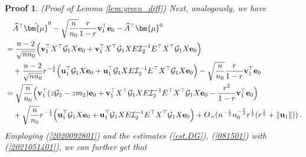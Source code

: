 \documentclass[12pt]{article}
\numberwithin{equation}{section}
\newtheorem{myPro}{Proof}
\theoremstyle{remark}
\newcommand{\1}{{\rm 1}\kern-0.24em{\rm I}}
\begin{document}
\begin{appendices}
\begin{myPro}{(Proof of Lemma \ref{lem:green_diff})}
Next, analogously, we have 
\begin{align*}
&\quad \widehat{A} ^{\top} \hat{\bm{\mu}}^0- \sqrt{\frac{n}{n_0}} \frac{r}{1-r} {\bf v}_1^{\top} {\bf e}_0 - \widehat{A} ^{\top} {\bm{\mu}}^0\notag\\
&= \frac{n-2}{\sqrt{nn_0}} \Big( {\bf v}_1^{\top} {X}^{\top} \mathcal{G}_1  {X}{\bf e}_0+ {\bf v}_1^{\top} {X}^{\top} \mathcal{G}_1{X}{E} \mathcal{I}_2^{-1}{E}^{\top} {X}^{\top} \mathcal{G}_1 {X}{\bf e}_0\Big)\notag\\
&\quad +  \frac{n-2}{\sqrt{nn_0}} r^{-\frac 14}\Big( {\bf u}_1^{\top}  \mathcal{G}_1  {X}{\bf e}_0+ {\bf u}_1^{\top} \mathcal{G}_1{X}{E} \mathcal{I}_2^{-1}{E}^{\top} {X}^{\top} \mathcal{G}_1 {X}{\bf e}_0\Big) - \sqrt{\frac{n}{n_0}} \frac{r}{1-r} {\bf v}_1^{\top} {\bf e}_0\notag\\
&= \sqrt{\frac{n}{n_0}} \Big({\bf v}_1^{\top}(z\mathcal{G}_2-zm_2){\bf e}_0 + {\bf v}_1^{\top} {X}^{\top} \mathcal{G}_1{X}{E} \mathcal{I}_2^{-1}{E}^{\top} {X}^{\top} \mathcal{G}_1 {X}{\bf e}_0 - \frac{r^2}{1-r} {\bf v}_1^{\top} {\bf e}_0\Big)\notag\\
&\quad + \sqrt{\frac{n}{n_0}}r^{-\frac 14}\Big( {\bf u}_1^{\top}  \mathcal{G}_1  {X}{\bf e}_0+ {\bf u}_1^{\top} \mathcal{G}_1{X}{E}\mathcal{I}_2^{-1}{E}^{\top} {X}^{\top} \mathcal{G}_1 {X}{\bf e}_0\Big) + O_\prec(n^{-\frac 12} n_0^{-\frac 12}r^{\frac 12} ( r^{\frac 12} + \Vert {\bf u}_1\Vert) )\,.
\end{align*}
Employing (\ref{2020092801}) and the estimates  (\ref{est.DG}), (\ref{081501}) with (\ref{2021051401}), we can further get that 

\end{myPro}
\end{appendices}
\end{document}
